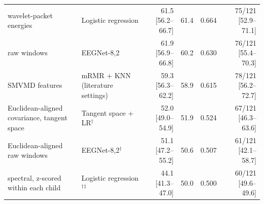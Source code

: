 \begin{tabular}{llrrrr}
wavelet-packet energies & Logistic regression & 61.5 [56.2--66.7] & 61.4 & 0.664 & 75/121 [52.9--71.1] \\
raw windows & EEGNet-8,2 & 61.9 [56.9--66.8] & 60.2 & 0.630 & 76/121 [55.4--70.3] \\
SMVMD features & mRMR + KNN (literature settings) & 59.3 [56.3--62.2] & 58.9 & 0.615 & 78/121 [56.2--72.7] \\
Euclidean-aligned covariance, tangent space & Tangent space + LR$^\dagger$ & 52.0 [49.0--54.9] & 51.9 & 0.524 & 67/121 [46.3--63.6] \\
Euclidean-aligned raw windows & EEGNet-8,2$^\dagger$ & 51.1 [47.2--55.2] & 50.6 & 0.507 & 61/121 [42.1--58.7] \\
spectral, z-scored within each child & Logistic regression$^\dagger$$^\ddagger$ & 44.1 [41.3--47.0] & 50.0 & 0.500 & 60/121 [49.6--49.6] \\
\hline
\end{tabular}
